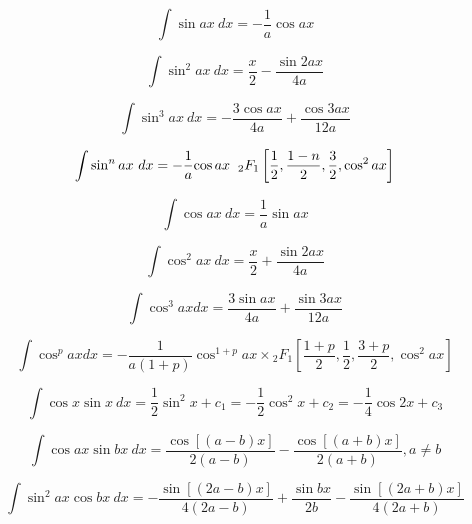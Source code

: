 \documentclass[12pt,letterpaper,leqno]{article}
\begin{document}
\begin{equation}
\int \sin ax \ dx = -\frac{1}{a} \cos ax 
\end{equation}

\begin{equation}
\int \sin^2 ax\  dx = \frac{x}{2} - \frac{\sin 2ax} {4a} 
\end{equation}

\begin{equation}
\int \sin^3 ax \ dx = -\frac{3 \cos ax}{4a} + \frac{\cos 3ax} {12a} 
\end{equation}

\begin{equation}
\int \sin^n ax \ dx =
 -\frac{1}{a}{\cos ax} \hspace{2mm}{_2F_1}\left[
\frac{1}{2}, \frac{1-n}{2}, \frac{3}{2}, \cos^2 ax
\right] 
\end{equation}



\begin{equation}
\int \cos ax\ dx= \frac{1}{a} \sin ax 
\end{equation}

\begin{equation}
\int \cos^2 ax\ dx = \frac{x}{2}+\frac{ \sin 2ax}{4a} 
\end{equation}

\begin{equation}
\int \cos^3 ax dx = \frac{3 \sin ax}{4a}+\frac{ \sin 3ax}{12a} 
\end{equation}

\begin{equation}
\int \cos^p ax dx  = -\frac{1}{a(1+p)}{\cos^{1+p} ax} \times 
{_2F_1}\left[
\frac{1+p}{2}, \frac{1}{2}, \frac{3+p}{2}, \cos^2 ax
\right] 
\end{equation}

\begin{equation}\label{eq:veky}
\int \cos x \sin x\ dx = \frac{1}{2}\sin^2 x + c_1 = -\frac{1}{2} \cos^2x + c_2 = -\frac{1}{4} \cos 2x + c_3
\end{equation}

\begin{equation}
\int \cos ax \sin bx\ dx = \frac{\cos[(a-b) x]}{2(a-b)} -
 \frac{\cos[(a+b)x]}{2(a+b)} , a\ne b
\end{equation}

\begin{equation}
\int \sin^2 ax \cos bx\ dx = 
-\frac{\sin[(2a-b)x]}{4(2a-b)} 
+ \frac{\sin bx}{2b} 
- \frac{\sin[(2a+b)x]}{4(2a+b)}
\end{equation}
\end{document}
